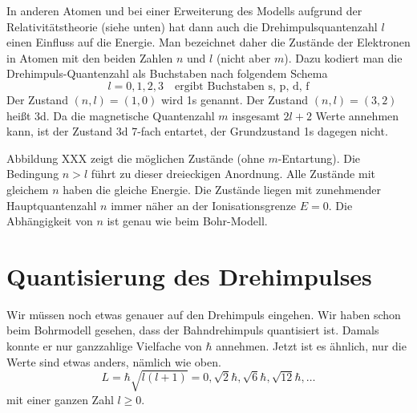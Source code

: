 In anderen Atomen und bei einer Erweiterung des Modells aufgrund der Relativitätstheorie (siehe unten) hat dann auch die Drehimpulsquantenzahl $l$ einen Einfluss auf die Energie. Man bezeichnet daher die Zustände der Elektronen in Atomen mit den beiden Zahlen $n$ und $l$ (nicht aber $m$). Dazu kodiert man die Drehimpuls-Quantenzahl als Buchstaben nach folgendem Schema
\begin{equation}
    l = 0, 1, 2, 3 \quad \text{ergibt Buchstaben \ \ s, p, d, f}
\end{equation}
Der Zustand $(n,l) = (1,0)$ wird 1s genannt. Der Zustand $(n,l) = (3,2)$ heißt 3d. Da die magnetische Quantenzahl $m$ insgesamt $2l+2$ Werte annehmen kann, ist der Zustand 3d 7-fach entartet, der Grundzustand 1s dagegen nicht.



Abbildung XXX zeigt die möglichen Zustände (ohne $m$-Entartung). Die Bedingung $n > l$ führt zu dieser dreieckigen Anordnung. Alle Zustände mit gleichem $n$ haben die gleiche Energie. Die Zustände liegen mit zunehmender Hauptquantenzahl $n$ immer näher an der Ionisationsgrenze $E=0$. Die Abhängigkeit von $n$ ist genau wie beim Bohr-Modell.


\section{Quantisierung des Drehimpulses}

Wir müssen noch etwas genauer auf den Drehimpuls eingehen. Wir haben schon beim Bohrmodell gesehen, dass der Bahndrehimpuls quantisiert ist. Damals konnte er nur ganzzahlige Vielfache von $\hbar$ annehmen. Jetzt ist es ähnlich, nur die Werte sind etwas anders, nämlich wie oben.
\begin{equation}
    L = \hbar \sqrt{l (l+1) } = 0, \sqrt{2} \hbar, \sqrt{6} \hbar, \sqrt{12} \hbar, \dots
\end{equation}
mit einer ganzen Zahl $l \ge 0$.

